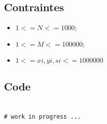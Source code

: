 \documentclass{article}
\begin{document}
        \subsection{Contraintes}
            \begin{itemize}
                \item $1 <= N <= 1 000$;
                \item $1 <= M <= 100 000$;
                \item $1 <= xi, yi, si <= 1 000 000$
            \end{itemize}
        
        \subsection{Code}
            \begin{verbatim}

# work in progress ...

            \end{verbatim}
        \newpage
\end{document}
